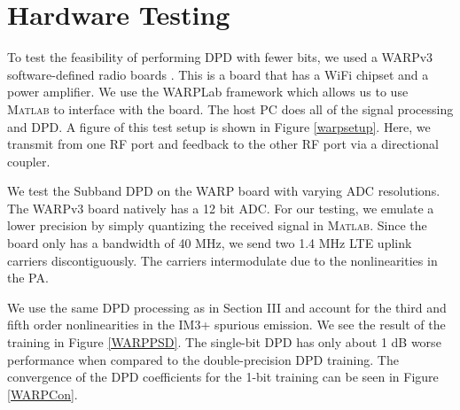 \documentclass[conference]{IEEEtran}
\begin{document}

\section{Hardware Testing}
To test the feasibility of performing DPD with fewer bits, we used a WARPv3 software-defined radio boards \cite{warpProject}. This is a board that has a WiFi chipset and a power amplifier. We use the WARPLab framework which allows us to use \textsc{Matlab} to interface with the board. The host PC does all of the signal processing and DPD. A figure of this test setup is shown in Figure \ref{warpsetup}. Here, we transmit from one RF port and feedback to the other RF port via a directional coupler. 

We test the Subband DPD on the WARP board with varying ADC resolutions. The WARPv3 board natively has a 12 bit ADC. For our testing, we emulate a lower precision by simply quantizing the received signal in \textsc{Matlab}. Since the board only has a bandwidth of 40 MHz, we send two 1.4 MHz LTE uplink carriers discontiguously. The carriers intermodulate due to the nonlinearities in the PA. 

We use the same DPD processing as in Section III and account for the third and fifth order nonlinearities in the IM3+ spurious emission. We see the result of the training in Figure \ref{WARPPSD}. The single-bit DPD has only about 1 dB worse performance when compared to the double-precision DPD training. The convergence of the DPD coefficients for the 1-bit training can be seen in Figure \ref{WARPCon}. 
\end{document}
